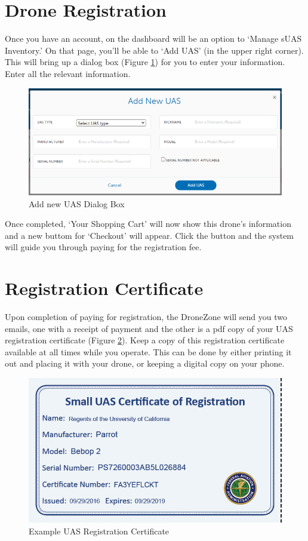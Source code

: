 \documentclass[
]{book}
\begin{document}
\hypertarget{drone-registration}{%
\section{Drone Registration}\label{drone-registration}}

Once you have an account, on the dashboard will be an option to `Manage sUAS Inventory.' On that page, you'll be able to `Add UAS' (in the upper right corner). This will bring up a dialog box (Figure \ref{fig:add-UAS}) for you to enter your information. Enter all the relevant information.

\begin{figure}

{\centering \includegraphics[width=0.8\linewidth]{images/Add_new_UAS} 

}

\caption{Add new UAS Dialog Box}\label{fig:add-UAS}
\end{figure}

Once completed, `Your Shopping Cart' will now show this drone's information and a new buttom for `Checkout' will appear. Click the button and the system will guide you through paying for the registration fee.

\hypertarget{registration-certificate}{%
\section{Registration Certificate}\label{registration-certificate}}

Upon completion of paying for registration, the DroneZone will send you two emails, one with a receipt of payment and the other is a pdf copy of your UAS registration certificate (Figure \ref{fig:reg-cert}). Keep a copy of this registration certificate available at all times while you operate. This can be done by either printing it out and placing it with your drone, or keeping a digital copy on your phone.

\begin{figure}

{\centering \includegraphics[width=0.5\linewidth]{images/reg_cert} 

}

\caption{Example UAS Registration Certificate}\label{fig:reg-cert}
\end{figure}
\end{document}
